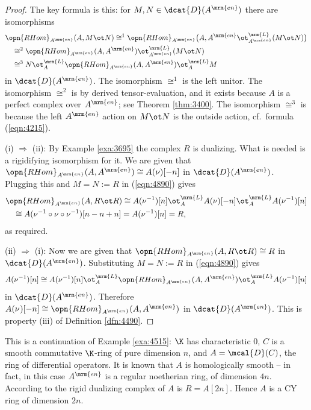 \begin{proof}
The key formula is this: for $M, N \in \dcat{D}(A^{\mrm{en}})$ there are 
isomorphisms
\begin{equation} \label{eqn:4890}
\begin{aligned}
& 
\opn{RHom}_{A^{\mrm{en}}}(A, M \ot N) \cong^{1}
\opn{RHom}_{A^{\mrm{en}}} \bigl( A, A^{\mrm{en}} 
\ot^{\mrm{L}}_{A^{\mrm{en}}} (M \ot N) \bigr) 
\\ & \quad
\cong^{2} \opn{RHom}_{A^{\mrm{en}}}(A, A^{\mrm{en}}) 
\ot^{\mrm{L}}_{A^{\mrm{en}}} (M \ot N)
\\ & \quad 
\cong^3 N \ot^{\mrm{L}}_{A} \opn{RHom}_{A^{\mrm{en}}}(A, A^{\mrm{en}}) 
\ot^{\mrm{L}}_{A} M 
\end{aligned}
\end{equation}
in $\dcat{D}(A^{\mrm{en}})$.
The isomorphism $\cong^1$ is the left unitor. 
The isomorphism $\cong^2$ is by derived tensor-evaluation, 
and it exists because 
$A$ is a perfect complex over $A^{\mrm{en}}$; see Theorem \ref{thm:3400}.
The isomorphism $\cong^3$ is because the left $A^{\mrm{en}}$ action on 
$M \ot N$ is the outside action, cf.\ formula (\ref{eqn:4215}). 

\medskip \noindent 
(i) $\Rightarrow$ (ii): By Example \ref{exa:3695} the complex $R$ is dualizing. 
What is needed is a rigidifying isomorphism for it. We are given that 
$\opn{RHom}_{A^{\mrm{en}}}(A, A^{\mrm{en}}) \cong A(\nu)[-n]$ 
in $\dcat{D}(A^{\mrm{en}})$. 
Plugging this and $M = N := R$ in (\ref{eqn:4890}) gives 
\[ \begin{aligned}
&
\opn{RHom}_{A^{\mrm{en}}}(A, R \ot R) \cong
A(\nu^{-1})[n] \ot^{\mrm{L}}_{A} A(\nu)[-n] \ot^{\mrm{L}}_{A} A(\nu^{-1})[n]
\\ & \quad 
\cong A(\nu^{-1} \circ \nu \circ \nu^{-1})[n - n + n] = 
A(\nu^{-1})[n] = R , 
\end{aligned} \]
as required. 

\medskip \noindent 
(ii) $\Rightarrow$ (i):
Now we are given that 
$\opn{RHom}_{A^{\mrm{en}}}(A, R \ot R) \cong R$ 
in $\dcat{D}(A^{\mrm{en}})$. Substituting 
$M = N := R$ in (\ref{eqn:4890}) gives 
\[ A(\nu^{-1})[n] \cong A(\nu^{-1})[n] \ot^{\mrm{L}}_{A}
\opn{RHom}_{A^{\mrm{en}}}(A, A^{\mrm{en}}) \ot^{\mrm{L}}_{A} A(\nu^{-1})[n] \]
in $\dcat{D}(A^{\mrm{en}})$. Therefore 
$A(\nu^{})[-n] \cong \opn{RHom}_{A^{\mrm{en}}}(A, A^{\mrm{en}})$ 
in $\dcat{D}(A^{\mrm{en}})$.
This is property (iii) of Definition \ref{dfn:4490}.
\end{proof}

\begin{exa} \label{exa:4895}
This is a continuation of Example \ref{exa:4515}: $\K$ has characteristic $0$, 
$C$ is a smooth commutative $\K$-ring of pure dimension $n$, and 
$A = \mcal{D}(C)$, the ring of differential operators.
It is known that $A$ is homologically smooth -- in fact, in this case 
$A^{\mrm{en}}$ is a regular noetherian ring, of dimension $4 n$. 
According to \cite[Theorem 2.6]{Ye4.5} the rigid dualizing complex of $A$ is
$R = A[2 n]$. Hence $A$ is a CY ring of dimension $2 n$.
\end{exa}

